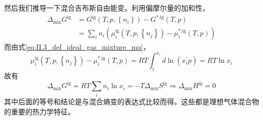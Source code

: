 \documentclass[main.tex]{subfiles}
\begin{document}
然后我们推导一下混合吉布斯自由能变。利用偏摩尔量的加和性，
\begin{align*}
    \Delta_\text{mix}G^\text{ig} & =G^\text{ig}\left(T,p,\left\{n_i\right\}\right)-G^\text{*,ig}\left(T,p\right)                               \\
                                 & =\sum_in_i\left(\mu_i^\text{ig}\left(T,p,\left\{n_j\right\}\right)-\mu_i^\text{*,ig}\left(T,p\right)\right)
\end{align*}
而由式\eqref{eq:II.3_def_ideal_gas_mixture_mu}，
\[\mu_i^\text{ig}\left(T,p,\left\{n_j\right\}\right)-\mu_i^\text{*,ig}\left(T,p\right)=RT\int_{1}^{x_i}d\ln\left(x_i^\prime p\right)=RT\ln x_i\]
故有
\[\Delta_\text{mix}G^\text{ig}=RT\sum_in_i\ln x_i=-T\Delta_\text{mix}S^\text{ig}\Rightarrow\Delta_\text{mix}H^\text{ig}=0\]
其中后面的等号和结论是与混合熵变的表达式比较而得。这些都是理想气体混合物的重要的热力学特征。
\end{document}
